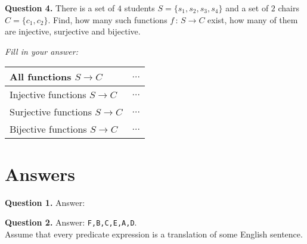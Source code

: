 \documentclass[jou]{apa6}
\begin{document}
\vspace{10pt}
{\bf Question 4.} There is a set of $4$ students $S = \{ s_1, s_2, s_3, s_4 \}$ and 
a set of $2$ chairs $C = \{ c_1, c_2 \}$. 
Find, how many such functions $f\,:\,S \rightarrow C$ exist, 
how many of them are injective, surjective and bijective.

{\em Fill in your answer:}

\begin{tabular}{ll} \hline
All functions $S \rightarrow C$ & $\ldots$ \\ \hline
Injective functions $S \rightarrow C$ & $\ldots$ \\ \hline
Surjective functions $S \rightarrow C$ & $\ldots$ \\ \hline
Bijective functions $S \rightarrow C$ & $\ldots$ \\\hline
\end{tabular}






\newpage 

\section{Answers}


{\bf Question 1.} Answer: 

\vspace{10pt}
{\bf Question 2.} Answer: {\tt F,B,C,E,A,D}.\\
Assume that every predicate expression is a translation of some English sentence. 
\end{document}
